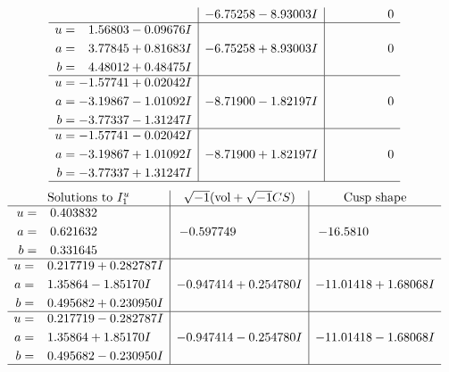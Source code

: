 \documentclass[1p]{elsarticle_modified}
\theoremstyle{definition}
\newcommand{\I}{\sqrt{-1}}
\begin{document}
$$\begin{array}{c|c|c}
 & -6.75258 - 8.93003 I & \phantom{-0.000000 } 0 \\ \hline\begin{aligned}
u &= \phantom{-}1.56803 - 0.09676 I \\
a &= \phantom{-}3.77845 + 0.81683 I \\
b &= \phantom{-}4.48012 + 0.48475 I\end{aligned}
 & -6.75258 + 8.93003 I & \phantom{-0.000000 } 0 \\ \hline\begin{aligned}
u &= -1.57741 + 0.02042 I \\
a &= -3.19867 - 1.01092 I \\
b &= -3.77337 - 1.31247 I\end{aligned}
 & -8.71900 - 1.82197 I & \phantom{-0.000000 } 0 \\ \hline\begin{aligned}
u &= -1.57741 - 0.02042 I \\
a &= -3.19867 + 1.01092 I \\
b &= -3.77337 + 1.31247 I\end{aligned}
 & -8.71900 + 1.82197 I & \phantom{-0.000000 } 0\\
 \hline 
 \end{array}$$\newpage$$\begin{array}{c|c|c}  
\text{Solutions to }I^u_{1}& \I (\text{vol} + \sqrt{-1}CS) & \text{Cusp shape}\\
 \hline 
\begin{aligned}
u &= \phantom{-}0.403832\phantom{ +0.000000I} \\
a &= \phantom{-}0.621632\phantom{ +0.000000I} \\
b &= \phantom{-}0.331645\phantom{ +0.000000I}\end{aligned}
 & -0.597749\phantom{ +0.000000I} & -16.5810\phantom{ +0.000000I} \\ \hline\begin{aligned}
u &= \phantom{-}0.217719 + 0.282787 I \\
a &= \phantom{-}1.35864 - 1.85170 I \\
b &= \phantom{-}0.495682 + 0.230950 I\end{aligned}
 & -0.947414 + 0.254780 I & -11.01418 + 1.68068 I \\ \hline\begin{aligned}
u &= \phantom{-}0.217719 - 0.282787 I \\
a &= \phantom{-}1.35864 + 1.85170 I \\
b &= \phantom{-}0.495682 - 0.230950 I\end{aligned}
 & -0.947414 - 0.254780 I & -11.01418 - 1.68068 I\\
 \hline 
 \end{array}$$\newpage\newpage\renewcommand{\arraystretch}{1}
\end{document}
